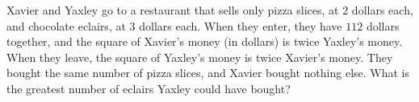 Xavier and Yaxley go to a restaurant that sells only pizza slices, at $2$ dollars each, and chocolate eclairs, at $3$ dollars each. When they enter, they have $112$ dollars together, and the square of Xavier's money (in dollars) is twice Yaxley's money. When they leave, the square of Yaxley's money is twice Xavier's money. They bought the same number of pizza slices, and Xavier bought nothing else. What is the greatest number of eclairs Yaxley could have bought?
